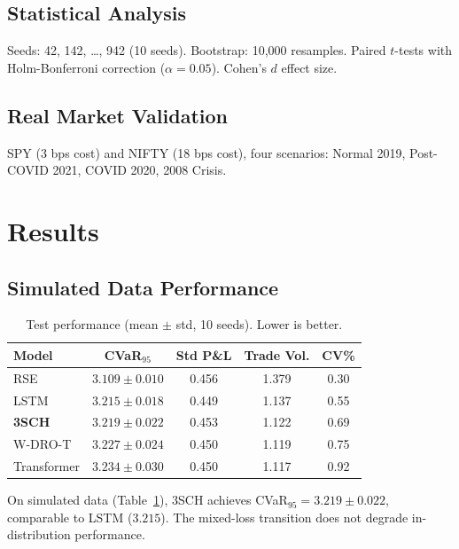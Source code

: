 \documentclass[11pt]{article}
\begin{document}
\subsection{Statistical Analysis}

Seeds: 42, 142, \ldots, 942 (10 seeds). Bootstrap: 10,000 resamples. Paired $t$-tests with Holm-Bonferroni correction ($\alpha = 0.05$). Cohen's $d$ effect size.

\subsection{Real Market Validation}

SPY (3 bps cost) and NIFTY (18 bps cost), four scenarios: Normal 2019, Post-COVID 2021, COVID 2020, 2008 Crisis.

\section{Results}
\label{sec:results}

\subsection{Simulated Data Performance}

\begin{table}[t]
\centering
\caption{Test performance (mean $\pm$ std, 10 seeds). Lower is better.}
\label{tab:main}
\small
\begin{tabular}{lcccc}
\toprule
\textbf{Model} & \textbf{CVaR$_{95}$} & \textbf{Std P\&L} & \textbf{Trade Vol.} & \textbf{CV\%} \\
\midrule
RSE & $3.109 \pm 0.010$ & 0.456 & 1.379 & 0.30 \\
LSTM & $3.215 \pm 0.018$ & 0.449 & 1.137 & 0.55 \\
\textbf{3SCH} & $3.219 \pm 0.022$ & 0.453 & 1.122 & 0.69 \\
W-DRO-T & $3.227 \pm 0.024$ & 0.450 & 1.119 & 0.75 \\
Transformer & $3.234 \pm 0.030$ & 0.450 & 1.117 & 0.92 \\
\bottomrule
\end{tabular}
\end{table}

On simulated data (Table~\ref{tab:main}), 3SCH achieves CVaR$_{95} = 3.219 \pm 0.022$, comparable to LSTM ($3.215$). The mixed-loss transition does not degrade in-distribution performance.
\end{document}
